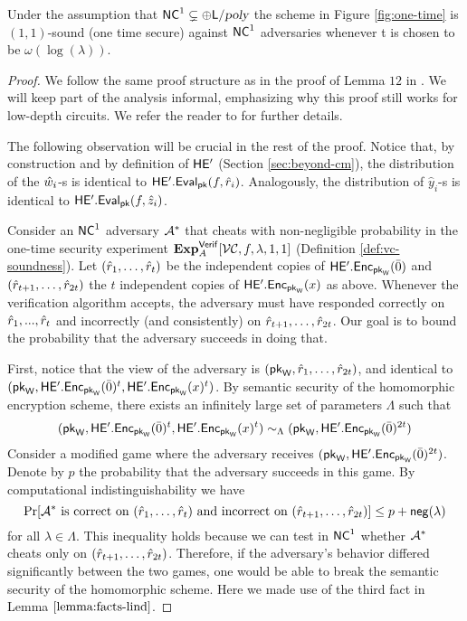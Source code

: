 \begin{lemma} 
\label{lemma:one-time}
Under the assumption that ${\mathsf{NC}}^1 \subsetneq \oplus {\ensuremath{\mathsf{L}}} / {\textsl{poly}}$ the  scheme in Figure \ref{fig:one-time} is $(1,1)$-sound (one time secure) against ${\mathsf{NC}}^1$ adversaries whenever t is chosen to be  $\omega(\log(\lambda))$.
\end{lemma}
\begin{proof}
We follow the same proof structure as in the proof of Lemma $12$ in \cite{ckv10}. We will keep part of the analysis informal, emphasizing why this proof still works for low-depth circuits. We refer the reader to \cite{ckv10} for further details.

The following observation will be crucial in the rest of the proof. Notice that, by construction and by definition of $\mathsf{HE'}$ (Section \ref{sec:beyond-cm}), the distribution of the $\hat{w}_i$-s is identical to $\mathsf{HE'.Eval}_{\mathsf{pk}}(f, \hat{r}_i)$. Analogously, the distribution of $\hat{y}_i$-s is identical to $\mathsf{HE'.Eval}_{\mathsf{pk}}(f, \hat{z}_i)$.

Consider an ${\mathsf{NC}}^1$ adversary $\mathcal{A}^*$ that cheats with non-negligible probability in the one-time security experiment ${\bf Exp}^{\mathsf{Verif}}_{A}[{\cal VC}, f, \lambda, 1,1]$ (Definition \ref{def:vc-soundness}).
Let $(\hat{r}_1,\dots,\hat{r}_{t})$ be the independent copies of $\mathsf{HE'.Enc}_{\mathsf{pk}_{\mathsf{W}}}(\bar{0})$ and  $(\hat{r}_{t+1},\dots,\hat{r}_{2t})$ the $t$ independent copies of
$\mathsf{HE'.Enc}_{\mathsf{pk}_{\mathsf{W}}}(x)$ as above. 
Whenever the verification algorithm accepts, the adversary must have responded correctly on $\hat{r}_1,...,\hat{r}_t$ and incorrectly (and consistently) on $\hat{r}_{t+1},\dots,\hat{r}_{2t}$. 
Our goal is to bound the probability that the adversary succeeds in doing that. 

First, notice that the view of the adversary is
$(\mathsf{pk}_{\mathsf{W}}, \hat{r}_1,\dots,\hat{r}_{2t})$, and identical to \\
$(\mathsf{pk}_{\mathsf{W}}, \mathsf{HE'.Enc}_{\mathsf{pk}_{\mathsf{W}}}(\bar{0})^t, \mathsf{HE'.Enc}_{\mathsf{pk}_{\mathsf{W}}}(x)^t)$.
By semantic security of the homomorphic encryption scheme, there exists an infinitely large set of parameters $\Lambda$ such that $$ (\mathsf{pk}_{\mathsf{W}}, \mathsf{HE'.Enc}_{\mathsf{pk}_{\mathsf{W}}}(\bar{0})^t, \mathsf{HE'.Enc}_{\mathsf{pk}_{\mathsf{W}}}(x)^t) \sim_{\Lambda} (\mathsf{pk}_{\mathsf{W}}, \mathsf{HE'.Enc}_{\mathsf{pk}_{\mathsf{W}}}(\bar{0})^{2t})$$ Consider a modified game where the adversary receives  $(\mathsf{pk}_{\mathsf{W}}, \mathsf{HE'.Enc}_{\mathsf{pk}_{\mathsf{W}}}(\bar{0})^{2t})$. Denote by $p$ the probability that the adversary succeeds in this game. By computational indistinguishability we have
\[
\Pr[\mathcal{A}^* \text{ is correct on } (\hat{r}_1,\dots,\hat{r}_{t}) \text{ and incorrect on } (\hat{r}_{t+1},\dots,\hat{r}_{2t}) ] \leq p + \mathsf{neg}(\lambda)
\]
for all $\lambda \in \Lambda$.
This inequality holds because we can test in ${\mathsf{NC}}^1$ whether $\mathcal{A}^*$ cheats only on $(\hat{r}_{t+1},\dots,\hat{r}_{2t})$. Therefore, if the adversary's behavior differed significantly between the two games, one would be able to break the semantic security of the homomorphic scheme. Here we made use of the third fact in Lemma $\ref{lemma:facts-lind}$.


\end{proof}
